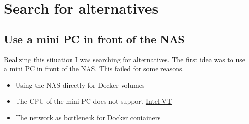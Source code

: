 

\section{Search for alternatives}

\subsection{Use a mini PC in front of the NAS}

Realizing this situation I was searching for alternatives. The first idea was
to use a \href{https://www.zotac.com/at/product/mini_pcs/id41-plus}{mini PC} in
front of the \gls{NAS}. This failed for some reasons.

\begin{itemize}
    \item Using the \gls{NAS} directly for \gls{Docker} volumes
    \item The CPU of the mini PC does not support \href{https://en.wikipedia.org/wiki/X86_virtualization}{Intel VT}
    \item The network as bottleneck for \gls{Docker} containers
\end{itemize}

